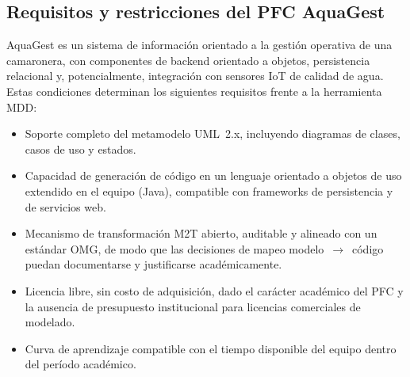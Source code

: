 \documentclass[11pt,a4paper]{article}
\begin{document}
\subsection{Requisitos y restricciones del PFC AquaGest}
AquaGest es un sistema de información orientado a la gestión operativa de una camaronera, con
componentes de backend orientado a objetos, persistencia relacional y, potencialmente, integración
con sensores IoT de calidad de agua. Estas condiciones determinan los siguientes requisitos frente a la
herramienta MDD:
\begin{itemize}[nosep]
  \item Soporte completo del metamodelo UML~2.x, incluyendo diagramas de clases, casos de uso y
        estados.
  \item Capacidad de generación de código en un lenguaje orientado a objetos de uso extendido en el
        equipo (Java), compatible con frameworks de persistencia y de servicios web.
  \item Mecanismo de transformación M2T abierto, auditable y alineado con un estándar OMG, de
        modo que las decisiones de mapeo modelo~$\rightarrow$~código puedan documentarse y
        justificarse académicamente.
  \item Licencia libre, sin costo de adquisición, dado el carácter académico del PFC y la ausencia de
        presupuesto institucional para licencias comerciales de modelado.
  \item Curva de aprendizaje compatible con el tiempo disponible del equipo dentro del período
        académico.
\end{itemize}
\end{document}
